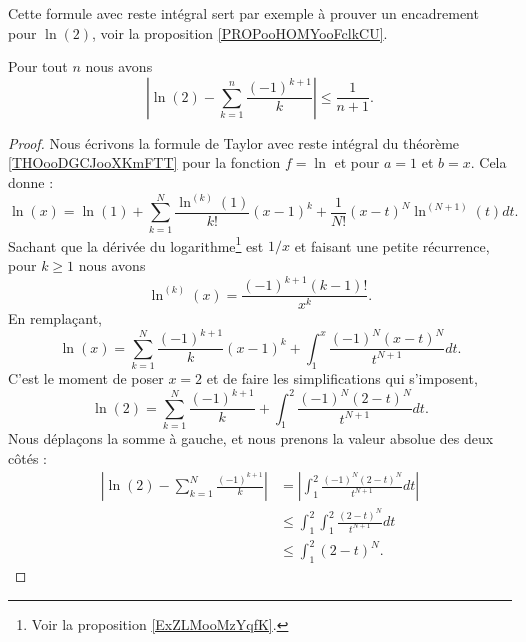 Cette formule avec reste intégral sert par exemple à prouver un encadrement pour \( \ln(2)\), voir la proposition \ref{PROPooHOMYooFclkCU}.

\begin{proposition}       \label{PROPooHOMYooFclkCU}
    Pour tout \( n\) nous avons
    \begin{equation}
        \left| \ln(2)-\sum_{k=1}^n\frac{ (-1)^{k+1} }{ k } \right|\leq \frac{1}{ n+1 }.
    \end{equation}
\end{proposition}

\begin{proof}
    Nous écrivons la formule de Taylor avec reste intégral du théorème \ref{THOooDGCJooXKmFTT} pour la fonction \( f=\ln\) et pour \( a=1\) et \( b=x\). Cela donne :
    \begin{equation}
        \ln(x)=\ln(1)+\sum_{k=1}^N\frac{ \ln^{(k)}(1) }{ k! }(x-1)^k+\frac{1}{ N! }(x-t)^N\ln^{(N+1)}(t)dt.
    \end{equation}
    Sachant que la dérivée du logarithme\footnote{Voir la proposition \ref{ExZLMooMzYqfK}.} est \( 1/x\) et faisant une petite récurrence, pour \( k\geq 1\) nous avons
    \begin{equation}
        \ln^{(k)}(x)=\frac{ (-1)^{k+1}(k-1)! }{ x^k }.
    \end{equation}
    En remplaçant,
    \begin{equation}
        \ln(x)=\sum_{k=1}^N\frac{ (-1)^{k+1} }{ k }(x-1)^k+\int_1^x\frac{ (-1)^N(x-t)^N }{ t^{N+1} }dt.
    \end{equation}
    C'est le moment de poser \( x=2\) et de faire les simplifications qui s'imposent,
    \begin{equation}
        \ln(2)=\sum_{k=1}^N\frac{ (-1)^{k+1} }{ k }+\int_1^2\frac{ (-1)^N(2-t)^N }{ t^{N+1} }dt.
    \end{equation}
    Nous déplaçons la somme à gauche, et nous prenons la valeur absolue des deux côtés :
    \begin{subequations}
        \begin{align}
            | \ln(2)-\sum_{k=1}^N\frac{ (-1)^{k+1} }{ k } |&=| \int_1^2\frac{ (-1)^N(2-t)^N }{ t^{N+1} }dt |\\
            &\leq\int_1^2\int_1^2\frac{ (2-t)^N }{ t^{N+1} }dt \label{SUBEQooZSXEooVcbJpd}\\
            &\leq \int_1^2(2-t)^N       \label{SUBEQooHGZLooGIhoVt}.
        \end{align}

\end{subequations}
\end{proof}
